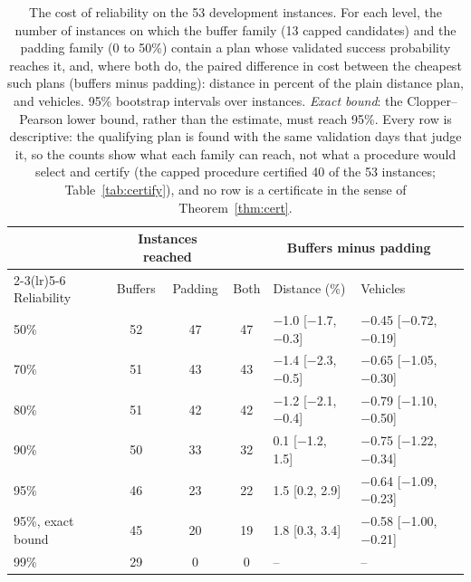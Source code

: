 \begin{table}[t]
\centering
\small
\setlength{\tabcolsep}{4pt}
\caption{The cost of reliability on the 53 development instances. For each level, the number of instances on which the buffer family (13 capped candidates) and the padding family (0 to 50\%) contain a plan whose validated success probability reaches it, and, where both do, the paired difference in cost between the cheapest such plans (buffers minus padding): distance in percent of the plain distance plan, and vehicles. 95\% bootstrap intervals over instances. \emph{Exact bound}: the Clopper--Pearson lower bound, rather than the estimate, must reach 95\%. Every row is descriptive: the qualifying plan is found with the same validation days that judge it, so the counts show what each family can reach, not what a procedure would select and certify (the capped procedure certified 40 of the 53 instances; Table~\ref{tab:certify}), and no row is a certificate in the sense of Theorem~\ref{thm:cert}.}
\label{tab:frontier}
\begin{tabular}{@{}lccclll@{}}
\toprule
 & \multicolumn{2}{c}{Instances reached} & & \multicolumn{2}{c}{Buffers minus padding} \\
\cmidrule(lr){2-3}\cmidrule(lr){5-6}
Reliability & Buffers & Padding & Both & Distance (\%) & Vehicles\\
\midrule
50\% & 52 & 47 & 47 & $-$1.0 [$-$1.7, $-$0.3] & $-$0.45 [$-$0.72, $-$0.19]\\
70\% & 51 & 43 & 43 & $-$1.4 [$-$2.3, $-$0.5] & $-$0.65 [$-$1.05, $-$0.30]\\
80\% & 51 & 42 & 42 & $-$1.2 [$-$2.1, $-$0.4] & $-$0.79 [$-$1.10, $-$0.50]\\
90\% & 50 & 33 & 32 & 0.1 [$-$1.2, 1.5] & $-$0.75 [$-$1.22, $-$0.34]\\
95\% & 46 & 23 & 22 & 1.5 [0.2, 2.9] & $-$0.64 [$-$1.09, $-$0.23]\\
95\%, exact bound & 45 & 20 & 19 & 1.8 [0.3, 3.4] & $-$0.58 [$-$1.00, $-$0.21]\\
99\% & 29 & 0 & 0 & -- & --\\
\bottomrule
\end{tabular}
\end{table}
